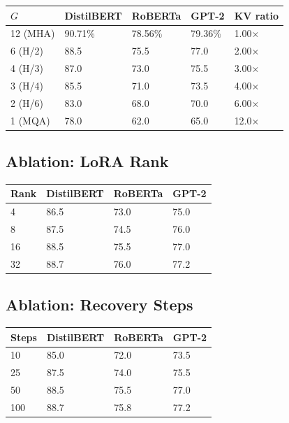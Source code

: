 \begin{table}[H]
\centering
\small
\begin{tabular}{lllll}
\toprule
\textbf{$G$} & \textbf{DistilBERT} & \textbf{RoBERTa} & \textbf{GPT-2} & \textbf{KV ratio} \\
\midrule
12 (MHA) & 90.71\% & 78.56\% & 79.36\% & 1.00$\times$ \\
6 (H/2) & 88.5 & 75.5 & 77.0 & 2.00$\times$ \\
4 (H/3) & 87.0 & 73.0 & 75.5 & 3.00$\times$ \\
3 (H/4) & 85.5 & 71.0 & 73.5 & 4.00$\times$ \\
2 (H/6) & 83.0 & 68.0 & 70.0 & 6.00$\times$ \\
1 (MQA) & 78.0 & 62.0 & 65.0 & 12.0$\times$ \\
\bottomrule
\end{tabular}
\end{table}

\subsection{Ablation: LoRA Rank}

\begin{table}[H]
\centering
\small
\begin{tabular}{llll}
\toprule
\textbf{Rank} & \textbf{DistilBERT} & \textbf{RoBERTa} & \textbf{GPT-2} \\
\midrule
4 & 86.5 & 73.0 & 75.0 \\
8 & 87.5 & 74.5 & 76.0 \\
16 & 88.5 & 75.5 & 77.0 \\
32 & 88.7 & 76.0 & 77.2 \\
\bottomrule
\end{tabular}
\end{table}

\subsection{Ablation: Recovery Steps}

\begin{table}[H]
\centering
\small
\begin{tabular}{llll}
\toprule
\textbf{Steps} & \textbf{DistilBERT} & \textbf{RoBERTa} & \textbf{GPT-2} \\
\midrule
10 & 85.0 & 72.0 & 73.5 \\
25 & 87.5 & 74.0 & 75.5 \\
50 & 88.5 & 75.5 & 77.0 \\
100 & 88.7 & 75.8 & 77.2 \\
\bottomrule
\end{tabular}
\end{table}

